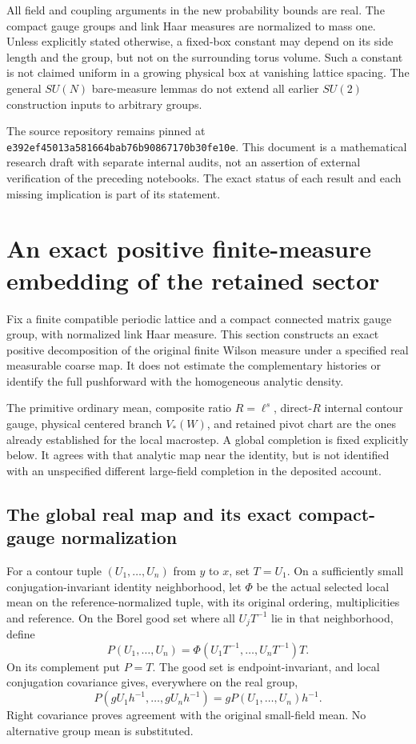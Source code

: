\documentclass[11pt]{article}
\theoremstyle{remark}
\begin{document}
All field and coupling arguments in the new probability bounds
are real. The compact gauge groups and link Haar measures are
normalized to mass one. Unless explicitly stated otherwise, a
fixed-box constant may depend on its side length and the group,
but not on the surrounding torus volume. Such a constant is not
claimed uniform in a growing physical box at vanishing lattice
spacing. The general \(SU(N)\) bare-measure lemmas do not extend
all earlier \(SU(2)\) construction inputs to arbitrary groups.

The source repository remains pinned at
\texttt{e392ef45013a581664bab76b90867170b30fe10e}. This document is
a mathematical research draft with separate internal audits, not
an assertion of external verification of the preceding notebooks.
The exact status of each result and each missing implication is
part of its statement.



\section{An exact positive finite-measure embedding of the retained sector}
\label{fps-section}

Fix a finite compatible periodic lattice and a compact connected matrix
gauge group, with normalized link Haar measure. This section constructs
an exact positive decomposition of the original finite Wilson measure
under a specified real measurable coarse map. It does not estimate the
complementary histories or identify the full pushforward with the
homogeneous analytic density.

The primitive ordinary mean, composite ratio \(R=\ell^s\), direct-\(R\)
internal contour gauge, physical centered branch \(V_*(W)\), and retained
pivot chart are the ones already established for the local macrostep.
A global completion is fixed explicitly below. It agrees with that
analytic map near the identity, but is not identified with an unspecified
different large-field completion in the deposited account.

\subsection{The global real map and its exact compact-gauge normalization}
\label{fps-completion-section}

For a contour tuple \((U_1,\ldots,U_n)\) from \(y\) to \(x\), set
\(T=U_1\). On a sufficiently small conjugation-invariant identity
neighborhood, let \(\Phi\) be the actual selected local mean on the
reference-normalized tuple, with its original ordering, multiplicities
and reference. On the Borel good set where all \(U_jT^{-1}\) lie in that
neighborhood, define
\[
 P(U_1,\ldots,U_n)=\Phi(U_1T^{-1},\ldots,U_nT^{-1})T.
\]
On its complement put \(P=T\). The good set is endpoint-invariant, and
local conjugation covariance gives, everywhere on the real group,
\[
 P(gU_1h^{-1},\ldots,gU_nh^{-1})=gP(U_1,\ldots,U_n)h^{-1}.
\]
Right covariance proves agreement with the original small-field mean.
No alternative group mean is substituted.
\end{document}
